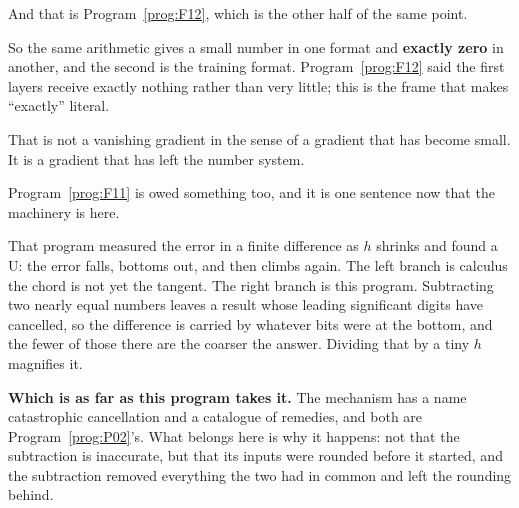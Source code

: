\begin{fr}

And that is Program~\ref{prog:F12}, which is the other half of the same point.

So the same arithmetic gives a small number in one format and \textbf{exactly
zero} in another, and the second is the training format.
Program~\ref{prog:F12}
said the first layers receive exactly nothing rather than very little; this is
the frame that makes \enquote{exactly} literal.

That is not a vanishing gradient in the sense of a gradient that has become
small. It is a gradient that has left the number system.
\end{fr}

\begin{fr}
Program~\ref{prog:F11} is owed something too, and it is one sentence now that
the machinery is here.

That program measured the error in a finite difference as $h$ shrinks and found
a U: the error falls, bottoms out, and then climbs again. The left branch is
calculus \dash{} the chord is not yet the tangent. The right branch is this
program. Subtracting two nearly equal numbers leaves a result whose leading
significant digits have cancelled, so the difference is carried by whatever
bits were at the bottom, and the fewer of those there are the coarser the
answer. Dividing that by a tiny $h$ magnifies it.

\begin{rigourbox}
\textbf{Which is as far as this program takes it.} The mechanism has a name \dash{}
catastrophic cancellation \dash{} and a catalogue of remedies, and both are
Program~\ref{prog:P02}'s. What belongs here is why it happens: not that the
subtraction is inaccurate, but that its inputs were rounded before it started,
and the subtraction removed everything the two had in common and left the
rounding behind.
\end{rigourbox}
\end{fr}

